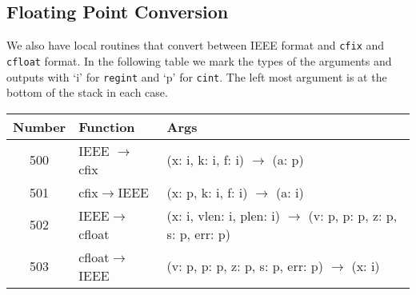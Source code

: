 \subsection{Floating Point Conversion}
We also have local routines that convert between IEEE format
and \verb|cfix| and \verb|cfloat| format.
In the following table we mark the types of the arguments
and outputs with `i' for \verb|regint| and `p' for \verb|cint|.
The left most argument is at the bottom of the stack
in each case.
\begin{center}
\begin{tabular}{c|l|l}
Number & Function & Args \\
\hline
	500 & IEEE $\rightarrow$ cfix & (x: i, k: i, f: i) $\rightarrow$ (a: p) \\
	501 & cfix$\rightarrow$IEEE & (x: p, k: i, f: i) $\rightarrow$ (a: i) \\
	502 & IEEE$\rightarrow$cfloat & (x: i, vlen: i, plen: i) $\rightarrow$ (v: p, p: p, z: p, s: p, err: p) \\
	503 & cfloat$\rightarrow$IEEE & (v: p, p: p, z: p, s: p, err: p) $\rightarrow$ (x: i) \\
\hline
\end{tabular}
\end{center}

